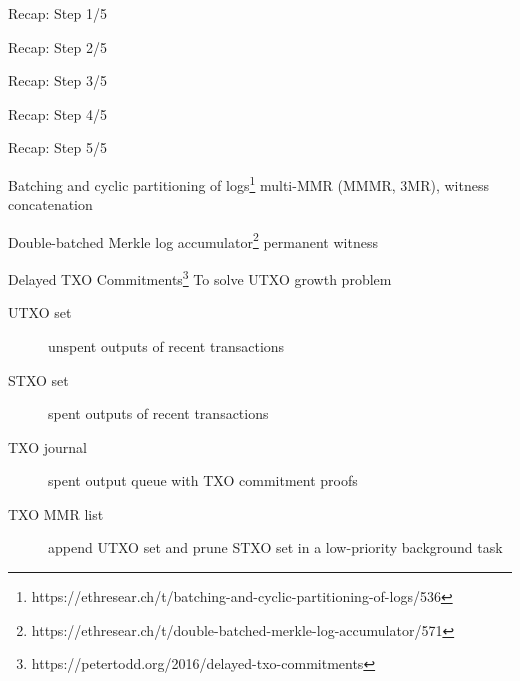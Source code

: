 \documentclass{beamer}
\begin{document}
\begin{frame}{Recap: Step 1/5}

\end{frame}

\begin{frame}{Recap: Step 2/5}

\end{frame}

\begin{frame}{Recap: Step 3/5}

\end{frame}

\begin{frame}{Recap: Step 4/5}

\end{frame}

\begin{frame}{Recap: Step 5/5}

\end{frame}

\begin{frame}{Batching and cyclic partitioning of logs\footnote{https://ethresear.ch/t/batching-and-cyclic-partitioning-of-logs/536}}
multi-MMR (MMMR, 3MR), witness concatenation
\begin{center}

\end{center}
\end{frame}

\begin{frame}{Double-batched Merkle log accumulator\footnote{https://ethresear.ch/t/double-batched-merkle-log-accumulator/571}}
permanent witness
\begin{center}

\end{center}
\end{frame}

\begin{frame}{Delayed TXO Commitments\footnote{https://petertodd.org/2016/delayed-txo-commitments}}
To solve UTXO growth problem
\begin{description}
\item[UTXO set] unspent outputs of recent transactions
\item[STXO set] spent outputs of recent transactions
\item[TXO journal] spent output queue with TXO commitment proofs
\item[TXO MMR list] append UTXO set and prune STXO set in a low-priority background task
\end{description}
\end{frame}
\end{document}
